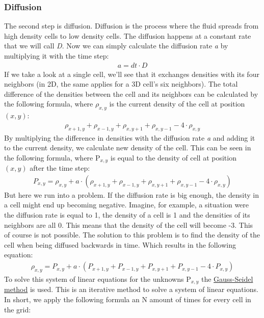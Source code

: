 \documentclass[a4paper,12pt,titlepage]{article}
\begin{document}
\subsubsection{Diffusion}
The second step is diffusion.
Diffusion is the process where the fluid spreads from high density cells to low density cells.
The diffusion happens at a constant rate that we will call \textit{D}. 
Now we can simply calculate the diffusion rate \textit{a} by multiplying it with the time step:
\[
\begin{array}{ll}
  a = dt \cdot D
\end{array}
\]
If we take a look at a single cell, we'll see that it exchanges densities with its four neighbors (in 2D, the same applies for a 3D cell's six neighbors).
The total difference of the densities between the cell and its neighbors can be calculated by the following formula,
where $\rho_{x, y}$ is the current density of the cell at position $(x, y)$:
\[
\begin{array}{ll}
	\rho_{x+1, y} + \rho_{x-1, y} + \rho_{x, y+1} + \rho_{x, y-1} - 4 \cdot \rho_{x, y}
\end{array}
\]
By multiplying the difference in densities with the diffusion rate \textit{a} and adding it to the current density, we calculate new density of the cell. 
This can be seen in the following formula, where P$_{x, y}$ is equal to the density of cell at position $(x, y)$ after the time step:
\[
\begin{array}{ll}
	P_{x, y} = \rho_{x, y} + a \cdot (\rho_{x+1, y} + \rho_{x-1, y} + \rho_{x, y+1} + \rho_{x, y-1} - 4 \cdot \rho_{x, y})
\end{array}
\]
But here we run into a problem. If the diffusion rate is big enough, the density in a cell might end up becoming negative.
Imagine, for example, a situation were the diffusion rate is equal to 1,  the density of a cell is 1 and the densities of its neighbors are all 0. This means that the density of the cell will become -3.
This of course is not possible.
The solution to this problem is to find the density of the cell when being diffused backwards in time. Which results in the following equation:
\[
\begin{array}{ll}
	\rho_{x, y} = P_{x, y} + a \cdot (P_{x+1, y} + P_{x-1, y} + P_{x, y+1} + P_{x, y-1} - 4 \cdot P_{x, y})
\end{array}	
\]
To solve this system of linear equations for the unknowns P$_{x, y}$ the \href{https://en.wikipedia.org/wiki/Gauss–Seidel_method}{Gauss-Seidel method} is used.
This is an iterative method to solve a system of linear equations. In short, we apply the following formula an N amount of times for every cell in the grid:
\end{document}
